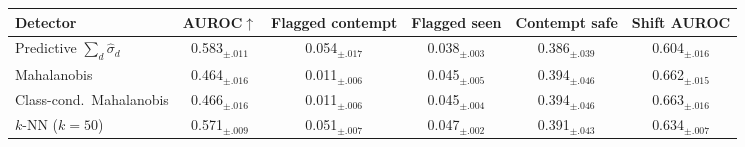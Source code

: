 \begin{tabular}{lccccc}
\toprule
Detector & AUROC$\uparrow$ & Flagged contempt & Flagged seen & Contempt safe & Shift AUROC \\
\midrule
Predictive $\sum_d\hat\sigma_d$ & 0.583$_{\pm.011}$ & 0.054$_{\pm.017}$ & 0.038$_{\pm.003}$ & 0.386$_{\pm.039}$ & 0.604$_{\pm.016}$ \\
Mahalanobis & 0.464$_{\pm.016}$ & 0.011$_{\pm.006}$ & 0.045$_{\pm.005}$ & 0.394$_{\pm.046}$ & 0.662$_{\pm.015}$ \\
Class-cond.\ Mahalanobis & 0.466$_{\pm.016}$ & 0.011$_{\pm.006}$ & 0.045$_{\pm.004}$ & 0.394$_{\pm.046}$ & 0.663$_{\pm.016}$ \\
$k$-NN ($k{=}50$) & 0.571$_{\pm.009}$ & 0.051$_{\pm.007}$ & 0.047$_{\pm.002}$ & 0.391$_{\pm.043}$ & 0.634$_{\pm.007}$ \\
\bottomrule
\end{tabular}
